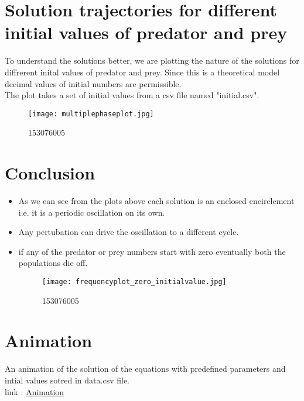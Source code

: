 \documentclass[12pt,a4paper]{article}
\begin{document}
	\section{Solution trajectories for different initial values of predator and prey}
	To understand the solutions better, we are plotting the nature of the solutions for diffrerent inital values of predator and prey. Since this is a theoretical model decimal values of initial numbers are permissible.
	\\
	The plot takes a set of initial values from a csv file named "initial.csv".
	\begin{figure}[!h]
		\centering
		\texttt{[image: multiplephaseplot.jpg]}
		\caption{153076005}
		\label{fig:phaseplot2}
	\end{figure}
	
\section{Conclusion}
\begin{itemize}
	\item As we can see from the plots above each solution is an enclosed encirclement i.e. it is a periodic oscillation on its own.
	\item Any pertubation can drive the oscillation to a different cycle.
	\item if any of the predator or prey numbers start with zero eventually both the populations die off.
	\begin{figure}[!h]
		\centering
		\texttt{[image: frequencyplot\_zero\_initialvalue.jpg]}
		\caption{153076005}
		\label{fig:zero_initialvalue}
	\end{figure}
\end{itemize}
\section{Animation}
An animation of the solution of the equations with predefined parameters and intial values sotred in data.csv file.
\\
link : \href{153076005.html}{Animation}


\end{document}
